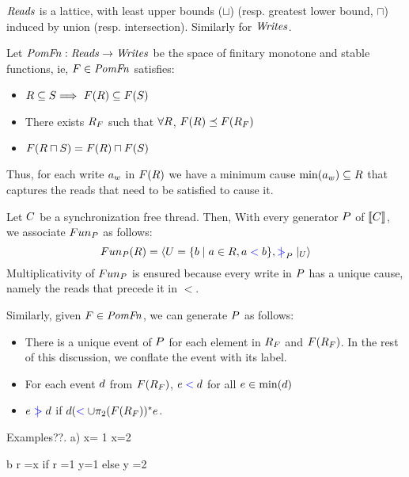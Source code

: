 $\mathit{Reads}$ is a lattice, with least upper bounds ($\sqcup$) (resp. greatest lower bound, $\sqcap$)  induced by union (resp. intersection).  Similarly for $\mathit{Writes}$. 

\begin{definition}
Let $\mathit{PomFn}: \mathit{Reads} \rightarrow \mathit{Writes}$ be the space of finitary monotone and stable functions, ie, $F \in \mathit{PomFn}$ satisfies:
\begin{itemize}
\item $R \subseteq S \Longrightarrow\ F(R) \subseteq F(S)$
\item There exists $R_{F}$ such that $\forall R$, $F(R) \preceq F(R_{F})$
\item $F(R \sqcap S) =  F(R) \sqcap F(S)$
\end{itemize}
\end{definition}
Thus, for each write  $a_w$ in $F(R)$ we have a minimum cause $\min(a_w) \subseteq R$ that captures the reads that need to be satisfied to cause it.   

Let $C$ be a synchronization free thread.  Then, 
With every generator $P$ of  $\llbracket C\rrbracket$, we associate $Fun_{P}$ as follows:
\[ Fun_{P}(R) = \langle U = \{ b \mid a \in R, a \mathrel{{\color{blue}<}} b \}, \mathrel{{\color{blue}\mkern4mu\mid\!\!\!>}}_{P} \mathbin{|}_{U} \rangle \]
Multiplicativity  of $Fun_{P}$ is ensured because every write in $P$ has a unique cause, namely the reads that precede it in $\lt$.

Similarly, given $F \in \mathit{PomFn}$, we can generate $P$ as follows:
\begin{itemize}
\item There is a unique event of $P$ for each element in $R_{F}$ and $F(R_{F})$.  In the rest of this discussion, we conflate the event with its label.
\item For each event $d$ from $F(R_{F})$, $e \mathrel{{\color{blue}<}} d$ for all $e \in \min(d)$
\item $e \mathrel{{\color{blue}\mkern4mu\mid\!\!\!>}} d$ if $ d (\mathrel{{\color{blue}<}} \cup \pi_2(F(R_{F}))^* e$.
\end{itemize}

Examples??.  
a) x= 1
x=2

b  r =x
   if r =1  {y=1}
   else      {y =2}

